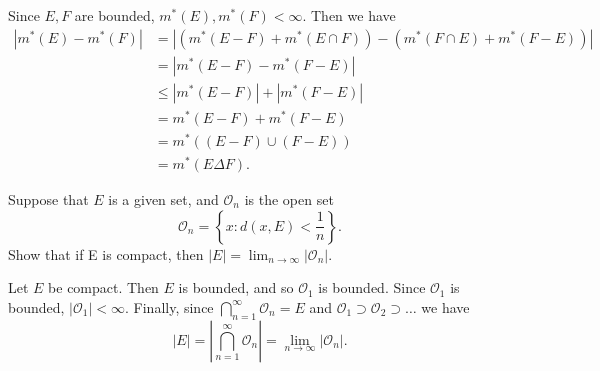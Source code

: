 \begin{solution}
  Since $E,F$ are bounded, $m^{*}\left(E\right), m^{*}\left(F\right) < \infty$.
  Then we have
  \begin{align*}
    \left| m^{*}\left( E \right) - m^{*}\left( F \right) \right| &= \left| (m^{*}\left( E - F \right) + m^{*}\left( E \cap F \right)) - \left( m^{*}\left( F \cap E \right) + m^{*}\left( F - E \right) \right) \right|\\
                                                                 &= \left| m^{*}\left( E - F \right) - m^{*}\left( F - E \right) \right|\\
                                                                 &\leq \left| m^{*}\left( E - F \right)  \right| + \left| m^{*}\left( F - E \right) \right|\\
                                                                 &= m^{*}\left( E - F \right) + m^{*}\left( F - E \right)\\
                                                                 &= m^{*}\left( \left( E - F \right) \cup \left( F - E \right) \right)\\
                                                                 &= m^{*}\left( E \Delta F \right)
  .\end{align*}
  
\end{solution}

\pagebreak

\begin{problem}{5}
  Suppose that $E$ is a given set, and $\mathcal{O}_{n}$ is the open set
  \[
  \mathcal{O}_{n} = \left\{ x : d(x,E) < \frac{1}{n} \right\}
  .\] 
  Show that if E is compact, then $|E| = \lim_{n \to \infty} \left| \mathcal{O}_{n} \right|$.
\end{problem}

\begin{solution}
  Let $E$ be compact. 
  Then $E$ is bounded, and so $\mathcal{O}_{1}$ is bounded.
  Since $\mathcal{O}_{1}$ is bounded, $\left| \mathcal{O}_{1} \right| < \infty$.
  Finally, since $\bigcap_{n=1}^{\infty}\mathcal{O}_{n} = E$ and $\mathcal{O}_{1} \supset \mathcal{O}_{2} \supset \ldots $ we have
  \[
  \left| E \right| = \left| \bigcap_{n=1}^{\infty} \mathcal{O}_{n} \right| = \lim_{n \to \infty} \left| \mathcal{O}_{n} \right|
  .\] 

\end{solution}

\pagebreak

